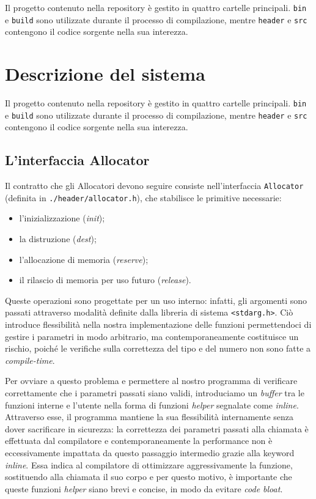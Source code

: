 \documentclass[noexaminfo]{sapthesis}  %
\begin{document}
Il progetto contenuto nella repository è gestito in quattro cartelle principali. \texttt{bin} e \texttt{build} sono utilizzate durante il processo di compilazione, mentre \texttt{header} e \texttt{src} contengono il codice sorgente nella sua interezza.

\section{Descrizione del sistema}

Il progetto contenuto nella repository è gestito in quattro cartelle principali. \texttt{bin} e \texttt{build} sono utilizzate durante il processo di compilazione, mentre \texttt{header} e \texttt{src} contengono il codice sorgente nella sua interezza.

\subsection{L’interfaccia Allocator}

Il contratto che gli Allocatori devono seguire consiste nell’interfaccia \texttt{Allocator} (definita in \texttt{./header/allocator.h}), che stabilisce le primitive necessarie:
\begin{itemize}
  \item l’inizializzazione (\textit{init});
  \item la distruzione (\textit{dest});
  \item l’allocazione di memoria (\textit{reserve});
  \item il rilascio di memoria per uso futuro (\textit{release}).
\end{itemize}
Queste operazioni sono progettate per un uso interno: infatti, gli argomenti sono passati attraverso modalità definite dalla libreria di sistema \texttt{<stdarg.h>}. Ciò introduce flessibilità nella nostra implementazione delle funzioni permettendoci di gestire i parametri in modo arbitrario, ma contemporaneamente costituisce un rischio, poiché le verifiche sulla correttezza del tipo e del numero non sono fatte a \textit{compile-time}.

Per ovviare a questo problema e permettere al nostro programma di verificare correttamente che i parametri passati siano validi, introduciamo un \textit{buffer} tra le funzioni interne e l’utente nella forma di funzioni \textit{helper} segnalate come \textit{inline}. Attraverso esse, il programma mantiene la sua flessibilità internamente senza dover sacrificare in sicurezza: la correttezza dei parametri passati alla chiamata è effettuata dal compilatore e contemporaneamente la performance non è eccessivamente impattata da questo passaggio intermedio grazie alla keyword \textit{inline}. Essa indica al compilatore di ottimizzare aggressivamente la funzione, sostituendo alla chiamata il suo corpo e per questo motivo, è importante che queste funzioni \textit{helper} siano brevi e concise, in modo da evitare \textit{code bloat}.
\end{document}
